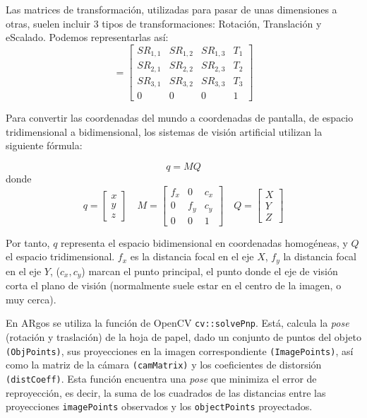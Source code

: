 Las matrices de transformación, utilizadas para pasar de unas dimensiones a otras, suelen incluir 3 tipos de transformaciones: Rotación, Translación y eScalado. Podemos representarlas así:
\begin{equation}
  [R|t] = \begin{bmatrix} SR_{1,1} & SR_{1,2} & SR_{1,3} & T_{1}  \\
                          SR_{2,1} & SR_{2,2} & SR_{2,3} & T_{2}  \\
                          SR_{3,1} & SR_{3,2} & SR_{3,3} & T_{3}  \\
                             0    &     0    &     0    &  1
  \end{bmatrix}
\end{equation}

Para convertir las coordenadas del mundo a coordenadas de pantalla, de espacio tridimensional a bidimensional, los sistemas de visión artificial utilizan la siguiente fórmula:

\begin{equation}
q=MQ
\end{equation}
donde
\begin{equation}
  q=\begin{bmatrix} x \\ y \\ z \end{bmatrix} \quad M=\begin{bmatrix} f_{x} & 0 & c_{x} \\ 0 & f_{y} & c_{y} \\ 0 & 0 & 1 \end{bmatrix} \quad Q=\begin{bmatrix} X \\ Y \\ Z \end{bmatrix}
\end{equation}

Por tanto, $q$ representa el espacio bidimensional en coordenadas homogéneas, y $Q$ el espacio
tridimensional. $f_{x}$ es la distancia focal en el eje $X$, $f_{y}$ la distancia focal en el eje
$Y$, ($c_{x},c_{y}$) marcan el punto principal, el punto donde el eje de visión corta el plano de
visión (normalmente suele estar en el centro de la imagen, o muy cerca).

En ARgos se utiliza la función de OpenCV \texttt{cv::solvePnp}. Está, calcula la \emph{pose} (rotación y
traslación) de la hoja de papel, dado un conjunto de puntos del objeto \texttt{(ObjPoints)}, sus proyecciones en
la imagen correspondiente \texttt{(ImagePoints)}, así como la matriz de la cámara \texttt{(camMatrix)} y los coeficientes
de distorsión \texttt{(distCoeff)}. Esta función encuentra una \emph{pose} que minimiza el error de reproyección, es
decir, la suma de los cuadrados de las distancias entre las proyecciones \texttt{imagePoints} observados y
los \texttt{objectPoints} proyectados.

